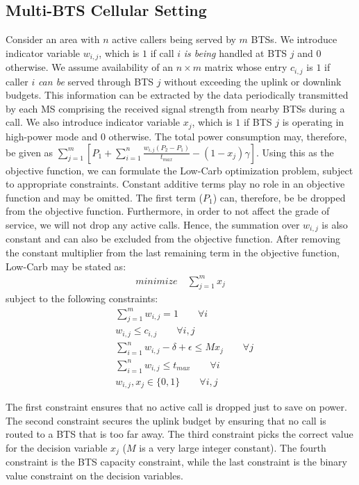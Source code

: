 \subsection{Multi-BTS Cellular Setting}
\label{subsec:case2:instantiate:multi-cell}
Consider an area with $n$ active callers being served by $m$ BTSs. We introduce indicator variable $w_{i,j}$, which is $1$ if call $i$ \textit{is being} handled at BTS $j$ and $0$ otherwise. We assume availability of an $n\times m$ matrix whose entry $c_{i,j}$ is $1$ if caller $i$ \textit{can be} served through
BTS $j$ without exceeding the uplink or downlink budgets. This information can be extracted by the data periodically transmitted by each MS comprising the received signal strength from nearby BTSs during a call. We also introduce indicator variable $x_j$, which is $1$ if BTS $j$ is operating in high-power mode and $0$ otherwise. The total power consumption may, therefore, be given as $\sum_{j=1}^{m} \left[P_1+\sum_{i=1}^{n}\frac{w_{i,j}(P_2-P_1)}{t_{max}}-(1-x_j)\gamma\right]$. Using this as the objective function, we can formulate the Low-Carb optimization problem, subject to appropriate constraints. Constant additive terms play no role in an objective function and may be omitted. The first term ($P_1$) can, therefore, be be dropped from the objective function. Furthermore, in order to not affect the grade of service, we will not drop any active calls. Hence, the summation over $w_{i,j}$ is also constant and can also be excluded from the objective function. After removing the constant multiplier from the last remaining term in the objective function, Low-Carb may be stated as:
\begin{align}
\textit{minimize} \quad \sum_{j=1}^{m} x_j
\end{align}
subject to the following constraints:
\begin{align}
& \sum_{j=1}^m w_{i,j} = 1 \qquad \forall i \\
& w_{i,j} \leq c_{i,j} \qquad \forall i, j \\
& \sum_{i=1}^nw_{i,j}-\delta + \epsilon \leq Mx_j \qquad \forall j \\
& \sum_{i=1}^n w_{i,j} \le t_{max} \qquad \forall i \\
& w_{i,j}, x_j \in \{0,1\} \qquad \forall i, j%
\end{align}

The first constraint ensures that no active call is
dropped just to save on power. The second constraint secures
the uplink budget by ensuring that no call is routed to a BTS
that is too far away. The third constraint picks the correct
value for the decision variable $x_j$ ($M$ is a very large integer constant). The fourth constraint is the BTS capacity constraint, while the last
constraint is the binary value constraint on the decision
variables.

